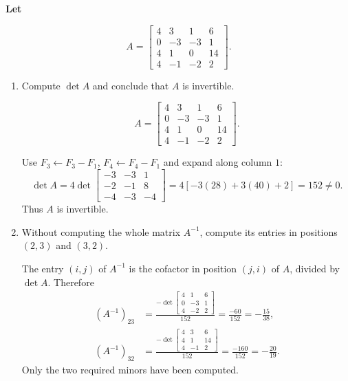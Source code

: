 \providecommand{\rank}{\operatorname{r}}
\providecommand{\RR}{\mathbb R}
\providecommand{\CC}{\mathbb C}
\providecommand{\KK}{\mathbb K}

\setcounter{enumi}{55}
\item {\bfseries\boldmath
Let
}

\[
A=\begin{bmatrix}4&3&1&6\\0&-3&-3&1\\4&1&0&14\\4&-1&-2&2\end{bmatrix}.
\]

\begin{enumerate}[label=\alph*)]

\item Compute $\det A$ and conclude that $A$ is invertible.

\begin{answer}
\[
 A=\begin{bmatrix}4&3&1&6\\0&-3&-3&1\\4&1&0&14\\4&-1&-2&2\end{bmatrix}.
\]

Use $F_3\gets F_3-F_1$, $F_4\gets F_4-F_1$ and expand along column $1$:
\[
 \det A=4\det\begin{bmatrix}-3&-3&1\\-2&-1&8\\-4&-3&-4\end{bmatrix}
 =4[-3(28)+3(40)+2]=152\ne0.
\]
Thus $A$ is invertible.
\end{answer}

\item Without computing the whole matrix $A^{-1}$, compute its entries in positions $(2,3)$ and $(3,2)$.

\begin{answer}
The entry $(i,j)$ of $A^{-1}$ is the cofactor in position $(j,i)$ of
$A$, divided by $\det A$. Therefore
\[
\begin{aligned}
 (A^{-1})_{23}
 &=\frac{-\det\begin{bmatrix}4&1&6\\0&-3&1\\4&-2&2\end{bmatrix}}{152}
 =\frac{-60}{152}=-\frac{15}{38},\\[4pt]
 (A^{-1})_{32}
 &=\frac{-\det\begin{bmatrix}4&3&6\\4&1&14\\4&-1&2\end{bmatrix}}{152}
 =\frac{-160}{152}=-\frac{20}{19}.
\end{aligned}
\]
Only the two required minors have been computed.
\end{answer}
\end{enumerate}
